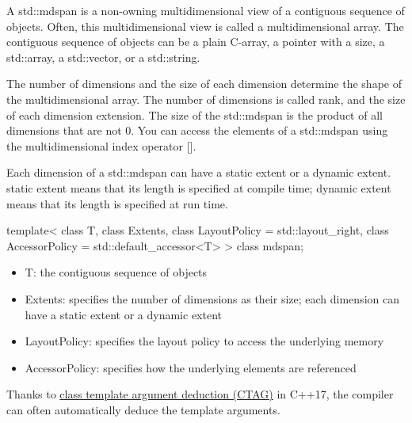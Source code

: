 A std::mdspan is a non-owning multidimensional view of a contiguous sequence of objects. Often, this multidimensional view is called a multidimensional array. The contiguous sequence of objects can be a plain C-array, a pointer with a size, a std::array, a std::vector, or a std::string.

The number of dimensions and the size of each dimension determine the shape of the multidimensional array. The number of dimensions is called rank, and the size of each dimension extension. The size of the std::mdspan is the product of all dimensions that are not 0. You can access the elements of a std::mdspan using the multidimensional index operator [].

Each dimension of a std::mdspan can have a static extent or a dynamic extent. static extent means that its length is specified at compile time; dynamic extent means that its length is specified at run time.


\begin{cpp}
template<
	class T,
	class Extents,
	class LayoutPolicy = std::layout_right,
	class AccessorPolicy = std::default_accessor<T>
> class mdspan;
\end{cpp}

\begin{itemize}
\item 
T: the contiguous sequence of objects

\item 
Extents: specifies the number of dimensions as their size; each dimension can have a static extent or a dynamic extent

\item 
LayoutPolicy: specifies the layout policy to access the underlying memory

\item 
AccessorPolicy: specifies how the underlying elements are referenced
\end{itemize}

Thanks to \href{https://en.cppreference.com/w/cpp/language/class_template_argument_deduction}{class template argument deduction (CTAG)} in C++17, the compiler can often automatically deduce the template arguments.


